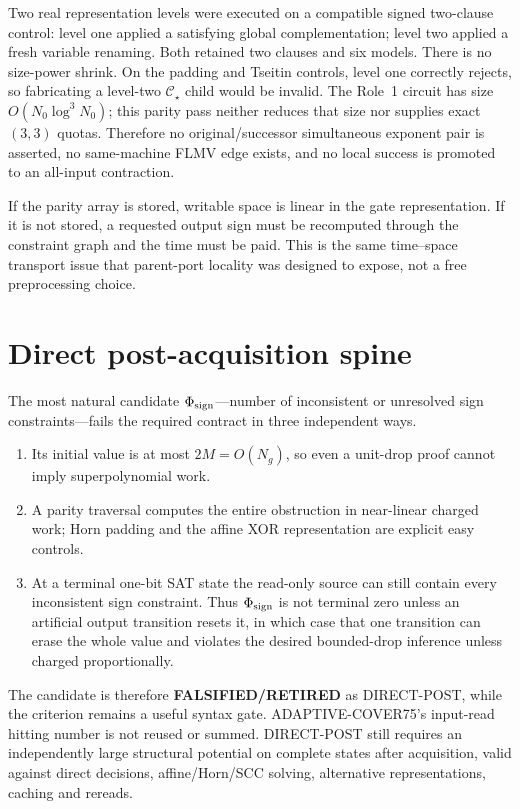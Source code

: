 \documentclass[11pt]{article}
\begin{document}
Two real representation levels were executed on a compatible signed two-clause control: level one applied a satisfying global complementation; level two applied a fresh variable renaming.  Both retained two clauses and six models.  There is no size-power shrink.  On the padding and Tseitin controls, level one correctly rejects, so fabricating a level-two $\mathcal C_\star$ child would be invalid.  The Role~1 circuit has size $O(N_0\log^3N_0)$; this parity pass neither reduces that size nor supplies exact $(3,3)$ quotas.  Therefore no original/successor simultaneous exponent pair is asserted, no same-machine FLMV edge exists, and no local success is promoted to an all-input contraction.

If the parity array is stored, writable space is linear in the gate representation.  If it is not stored, a requested output sign must be recomputed through the constraint graph and the time must be paid.  This is the same time--space transport issue that parent-port locality was designed to expose, not a free preprocessing choice.

\section{Direct post-acquisition spine}
The most natural candidate $\Phi_{\rm sign}$---number of inconsistent or unresolved sign constraints---fails the required contract in three independent ways.
\begin{enumerate}
\item Its initial value is at most $2M=O(N_g)$, so even a unit-drop proof cannot imply superpolynomial work.
\item A parity traversal computes the entire obstruction in near-linear charged work; Horn padding and the affine XOR representation are explicit easy controls.
\item At a terminal one-bit SAT state the read-only source can still contain every inconsistent sign constraint.  Thus $\Phi_{\rm sign}$ is not terminal zero unless an artificial output transition resets it, in which case that one transition can erase the whole value and violates the desired bounded-drop inference unless charged proportionally.
\end{enumerate}
The candidate is therefore \textbf{FALSIFIED/RETIRED} as DIRECT-POST, while the criterion remains a useful syntax gate.  ADAPTIVE-COVER75's input-read hitting number is not reused or summed.  DIRECT-POST still requires an independently large structural potential on complete states after acquisition, valid against direct decisions, affine/Horn/SCC solving, alternative representations, caching and rereads.
\end{document}
